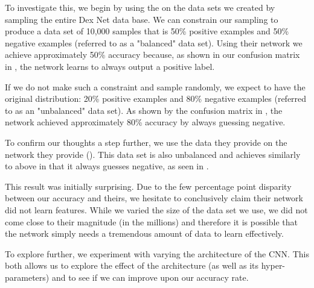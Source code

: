 To investigate this, we begin by using the  on the data sets we created by sampling the entire Dex Net data base. 
We can constrain our sampling to produce a data set of 10,000 samples that is 50\% positive examples and 50\% negative examples (referred to as a "balanced" data set). 
Using their network we achieve approximately 50\% accuracy because, as shown in our confusion matrix in , the network learns to always output a positive label. 

If we do not make such a constraint and sample randomly, we expect to have the original distribution: 20\% positive examples and 80\% negative examples (referred to as an "unbalanced" data set). 
As shown by the confusion matrix in , the network achieved approximately 80\% accuracy by always guessing negative. 

To confirm our thoughts a step further, we use the data they provide on the network they provide (). 
This data set is also unbalanced and achieves similarly to above in that it always guesses negative, as seen in . 

This result was initially surprising. 
Due to the few percentage point disparity between our accuracy and theirs, we hesitate to conclusively claim their network did not learn features. 
While we varied the size of the data set we use, we did not come close to their magnitude (in the millions) and therefore it is possible that the network simply needs a tremendous amount of data to learn effectively. 

To explore further, we experiment with varying the architecture of the CNN. 
This both allows us to explore the effect of the architecture (as well as its hyper-parameters) and to see if we can improve upon our accuracy rate. 

